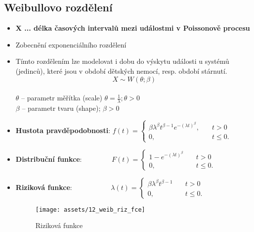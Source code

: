 \subsection{Weibullovo rozdělení}
\begin{itemize}
    \item \textbf{X ... délka časových intervalů mezi událostmi v Poissonově procesu}
    \item Zobecnění exponenciálního rozdělení
    \item Tímto rozdělením lze modelovat i dobu do výskytu události u systémů (jedinců), které jsou v období dětských nemocí, resp. období stárnutí.
          $$X \sim W(\theta;\beta)$$
          \\ $\theta$ -- parametr měřítka (scale) $\theta = \frac{1}{\lambda}; \theta > 0$ \\ $\beta$ -- parametr tvaru (shape); $\beta > 0$
    \item \textbf{Hustota pravděpodobnosti}:
          $f(t) =	\begin{cases}
                  \beta\lambda^{\beta} t^{\beta-1}e^{-(\lambda t)^{\beta}}, & \quad t > 0     \\
                  0,                                                        & \quad t \leq 0.
              \end{cases}$
    \item \textbf{Distribuční funkce}:
          $\qquad\qquad F(t) =	\begin{cases}
                  1 -  e^{-(\lambda t)^{\beta} } & \quad t > 0     \\
                  0,                             & \quad t \leq 0.
              \end{cases}$
    \item \textbf{Riziková funkce}:
          $\qquad\qquad\quad\; \lambda(t) =	\begin{cases}
                  \beta\lambda^\beta t^{\beta-1} & \quad t > 0     \\
                  0,                             & \quad t \leq 0.
              \end{cases}$
          \begin{figure}[H]
              \centering
              \texttt{[image: assets/12\_weib\_riz\_fce]}
              \caption{Riziková funkce}
          \end{figure}
\end{itemize}
